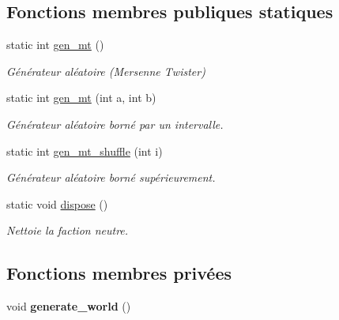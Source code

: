 \subsection*{Fonctions membres publiques statiques}
\begin{DoxyCompactItemize}
\item 
static int \hyperlink{classWorld_ae1a517e48a53300f77b9715f2d05da9f}{gen\-\_\-mt} ()
\begin{DoxyCompactList}\small\item\em Générateur aléatoire (Mersenne Twister) \end{DoxyCompactList}\item 
static int \hyperlink{classWorld_a5e407254abb3e35217524fe37f8a6a82}{gen\-\_\-mt} (int a, int b)
\begin{DoxyCompactList}\small\item\em Générateur aléatoire borné par un intervalle. \end{DoxyCompactList}\item 
static int \hyperlink{classWorld_aeeb9732117c1ed11efd98d17b1177e54}{gen\-\_\-mt\-\_\-shuffle} (int i)
\begin{DoxyCompactList}\small\item\em Générateur aléatoire borné supérieurement. \end{DoxyCompactList}\item 
\hypertarget{classWorld_abf19b18c7eb174377bf99b41aa84e769}{static void \hyperlink{classWorld_abf19b18c7eb174377bf99b41aa84e769}{dispose} ()}\label{classWorld_abf19b18c7eb174377bf99b41aa84e769}

\begin{DoxyCompactList}\small\item\em Nettoie la faction neutre. \end{DoxyCompactList}\end{DoxyCompactItemize}
\subsection*{Fonctions membres privées}
\begin{DoxyCompactItemize}
\item 
\hypertarget{classWorld_a97231d15fa0e1953eb69fec82e098794}{void {\bfseries generate\-\_\-world} ()}\label{classWorld_a97231d15fa0e1953eb69fec82e098794}

\end{DoxyCompactItemize}
